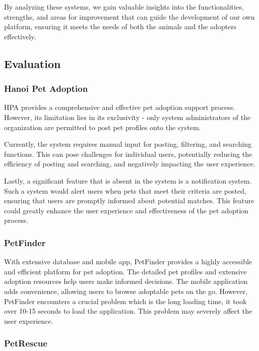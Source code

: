 By analyzing these systems, we gain valuable insights into the functionalities, strengths, and areas for improvement that can guide the development of our own platform, ensuring it meets the needs of both the animals and the adopters effectively.

\subsection{Evaluation}
\subsubsection*{Hanoi Pet Adoption}

HPA provides a comprehensive and effective pet adoption support process. However, its limitation lies in its exclusivity - only system administrators of the organization are permitted to post pet profiles onto the system.

Currently, the system requires manual input for posting, filtering, and searching functions. This can pose challenges for individual users, potentially reducing the efficiency of posting and searching, and negatively impacting the user experience.

Lastly, a significant feature that is absent in the system is a notification system. Such a system would alert users when pets that meet their criteria are posted, ensuring that users are promptly informed about potential matches. This feature could greatly enhance the user experience and effectiveness of the pet adoption process.

\subsubsection*{PetFinder}

With extensive database and mobile app, PetFinder provides a highly accessible and efficient platform for pet adoption. The detailed pet profiles and extensive adoption resources help users make informed decisions. The mobile application adds convenience, allowing users to browse adoptable pets on the go. However, PetFinder encounters a crucial problem which is the long loading time, it took over 10-15 seconds to load the application. This problem may severely affect the user experience.

\subsubsection*{PetRescue}

